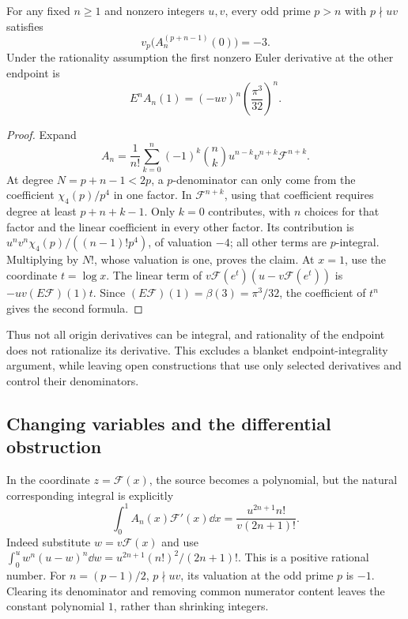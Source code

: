 \begin{proposition}\label{prop:niven-prime}
For any fixed $n\geq1$ and nonzero integers $u,v$, every odd prime
$p>n$ with $p\nmid uv$ satisfies
\[
 v_p\bigl(A_n^{(p+n-1)}(0)\bigr)=-3.
\]
Under the rationality assumption the first nonzero Euler derivative
at the other endpoint is
\[
 E^nA_n(1)=(-uv)^n\left(\frac{\pi^3}{32}\right)^n.
\]
\end{proposition}
\begin{proof}
Expand
\[
 A_n=\frac1{n!}\sum_{k=0}^n(-1)^k\binom nk
                   u^{n-k}v^{n+k}\mathcal F^{n+k}.
\]
At degree $N=p+n-1<2p$, a $p$-denominator can only come from the
coefficient $\chi_4(p)/p^4$ in one factor. In $\mathcal F^{n+k}$,
using that coefficient requires degree at least $p+n+k-1$.
Only $k=0$ contributes, with $n$ choices for that factor and the
linear coefficient in every other factor. Its contribution is
$u^nv^n\chi_4(p)/((n-1)!p^4)$, of valuation $-4$; all other terms
are $p$-integral. Multiplying by $N!$, whose valuation is one,
proves the claim. At $x=1$, use the coordinate $t=\log x$.
The linear term of $v\mathcal F(e^t)(u-v\mathcal F(e^t))$ is
$-uv(E\mathcal F)(1)t$. Since $(E\mathcal F)(1)=\beta(3)=\pi^3/32$,
the coefficient of $t^n$ gives the second formula.
\end{proof}
Thus not all origin derivatives can be integral, and rationality of
the endpoint does not rationalize its derivative. This excludes a
blanket endpoint-integrality argument, while leaving open constructions
that use only selected derivatives and control their denominators.

\subsection{Changing variables and the differential obstruction}
In the coordinate $z=\mathcal F(x)$, the source becomes a polynomial,
but the natural corresponding integral is explicitly
\begin{equation}\label{eq:niven-beta}
 \int_0^1 A_n(x)\mathcal F'(x)\dd x
       =\frac{u^{2n+1}n!}{v(2n+1)!}.
\end{equation}
Indeed substitute $w=v\mathcal F(x)$ and use
$\int_0^u w^n(u-w)^n\dd w=u^{2n+1}(n!)^2/(2n+1)!$.
This is a positive rational number. For
$n=(p-1)/2$, $p\nmid uv$, its valuation at the odd prime $p$ is
$-1$. Clearing its denominator and removing common numerator content
leaves the constant polynomial $1$, rather than shrinking integers.

